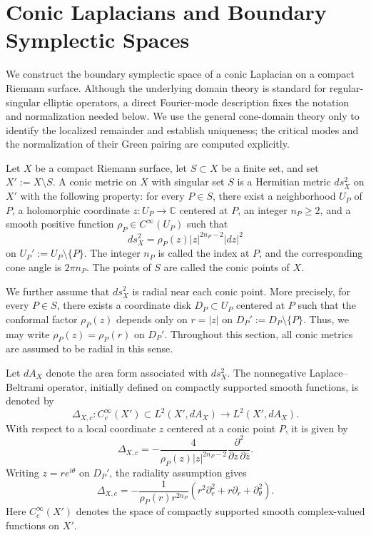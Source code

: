 \documentclass[12pt]{amsart}
\theoremstyle{plain}
\theoremstyle{definition}
\theoremstyle{remark}
\numberwithin{equation}{section} \numberwithin{figure}{section}
\renewcommand*{\to}{\rightarrow}
\begin{document}
\section{Conic Laplacians and Boundary Symplectic Spaces}
We construct the boundary symplectic space of a conic Laplacian on a
compact Riemann surface. Although the underlying domain theory is
standard for regular-singular elliptic operators, a direct
Fourier-mode description fixes the notation and normalization needed
below. We use the general cone-domain theory only to identify the
localized remainder and establish uniqueness; the critical modes and
the normalization of their Green pairing are computed explicitly.

Let \(X\) be a compact Riemann surface, let \(S\subset X\) be a finite set,
and set \(X':=X\setminus S\). A conic metric on \(X\) with singular set
\(S\) is a Hermitian metric \(ds_X^2\) on \(X'\) with the following
property: for every \(P\in S\), there exist a neighborhood \(U_P\) of
\(P\), a holomorphic coordinate \(z:U_P\to\mathbb C\) centered at \(P\),
an integer \(n_P\geq 2\), and a smooth positive function
\(\rho_P\in C^\infty(U_P)\) such that
\[
ds_X^2=\rho_P(z)|z|^{2n_P-2}|dz|^2
\]
on \(U_P':=U_P\setminus\{P\}\). The integer \(n_P\) is called the index
at \(P\), and the corresponding cone angle is \(2\pi n_P\). The points
of \(S\) are called the conic points of \(X\).

We further assume that \(ds_X^2\) is radial near each conic point. More
precisely, for every \(P\in S\), there exists a coordinate disk
\(D_P\subset U_P\) centered at \(P\) such that the conformal factor
\(\rho_P(z)\) depends only on \(r=|z|\) on
\(D_P':=D_P\setminus\{P\}\). Thus, we may write
\(
\rho_P(z)=\rho_P(r)
\)
on \(D_P'\). Throughout this section, all conic metrics are assumed to
be radial in this sense.

Let \(dA_X\) denote the area form associated with \(ds_X^2\). The
nonnegative Laplace--Beltrami operator, initially defined on compactly
supported smooth functions, is denoted by
\[
\Delta_{X,c}:C_c^\infty(X')\subset L^2(X',dA_X)
\longrightarrow L^2(X',dA_X).
\]
With respect to a local coordinate \(z\) centered at a conic point
\(P\), it is given by
\[
\Delta_{X,c}
=
-\frac{4}{\rho_P(z)|z|^{2n_P-2}}
\frac{\partial^2}{\partial z\,\partial\overline z}.
\]
Writing \(z=re^{i\theta}\) on \(D_P'\), the radiality assumption gives
\[
\Delta_{X,c}
=
-\frac{1}{\rho_P(r)r^{2n_P}}
\left(
r^2\partial_r^2+r\partial_r+\partial_\theta^2
\right).
\]
Here \(C_c^\infty(X')\) denotes the space of compactly supported smooth
complex-valued functions on \(X'\).
\end{document}
